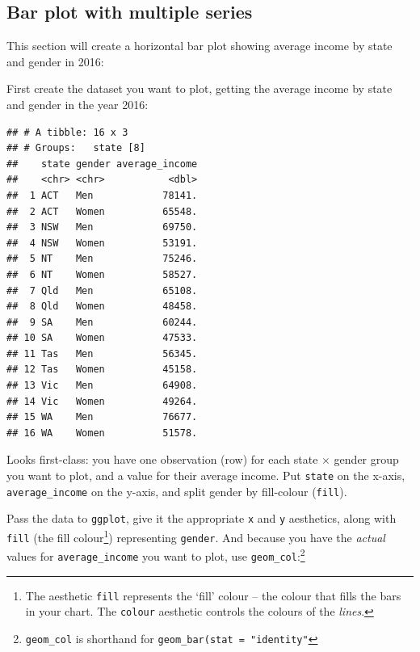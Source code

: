 \documentclass[]{book}
\newenvironment{Shaded}{\begin{snugshade}}{\end{snugshade}}
\newcommand{\DataTypeTok}[1]{\textcolor[rgb]{0.13,0.29,0.53}{#1}}
\newcommand{\DecValTok}[1]{\textcolor[rgb]{0.00,0.00,0.81}{#1}}
\newcommand{\KeywordTok}[1]{\textcolor[rgb]{0.13,0.29,0.53}{\textbf{#1}}}
\newcommand{\NormalTok}[1]{#1}
\newcommand{\OperatorTok}[1]{\textcolor[rgb]{0.81,0.36,0.00}{\textbf{#1}}}
\newcommand{\StringTok}[1]{\textcolor[rgb]{0.31,0.60,0.02}{#1}}
\let\rmarkdownfootnote\footnote%
\def\footnote{\protect\rmarkdownfootnote}
\begin{document}
\hypertarget{bar-multi}{%
\subsection{Bar plot with multiple series}\label{bar-multi}}

This section will create a horizontal bar plot showing average income by state and gender in 2016:

First create the dataset you want to plot, getting the average income by state and gender in the year 2016:

\begin{Shaded}
\end{Shaded}

\begin{verbatim}
## # A tibble: 16 x 3
## # Groups:   state [8]
##    state gender average_income
##    <chr> <chr>           <dbl>
##  1 ACT   Men            78141.
##  2 ACT   Women          65548.
##  3 NSW   Men            69750.
##  4 NSW   Women          53191.
##  5 NT    Men            75246.
##  6 NT    Women          58527.
##  7 Qld   Men            65108.
##  8 Qld   Women          48458.
##  9 SA    Men            60244.
## 10 SA    Women          47533.
## 11 Tas   Men            56345.
## 12 Tas   Women          45158.
## 13 Vic   Men            64908.
## 14 Vic   Women          49264.
## 15 WA    Men            76677.
## 16 WA    Women          51578.
\end{verbatim}

Looks first-class: you have one observation (row) for each state \(\times\) gender group you want to plot, and a value for their average income. Put \texttt{state} on the x-axis, \texttt{average\_income} on the y-axis, and split gender by fill-colour (\texttt{fill}).

Pass the data to \texttt{ggplot}, give it the appropriate \texttt{x} and \texttt{y} aesthetics, along with \texttt{fill} (the fill colour\footnote{The aesthetic \texttt{fill} represents the `fill' colour -- the colour that fills the bars in your chart. The \texttt{colour} aesthetic controls the colours of the \emph{lines}.}) representing \texttt{gender}. And because you have the \emph{actual} values for \texttt{average\_income} you want to plot, use \texttt{geom\_col}:\footnote{\texttt{geom\_col} is shorthand for \texttt{geom\_bar(stat\ =\ "identity"}}
\end{document}
